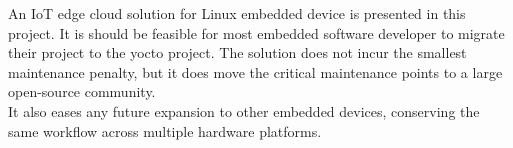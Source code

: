 \documentclass[../../main.tex]{subfiles}
\begin{document}
An IoT edge cloud solution for Linux embedded device is presented in this project.
It is should be feasible for most embedded software developer to migrate their
project to the yocto project.
The solution does not incur the smallest maintenance penalty, but it does move the critical 
maintenance points to a large open-source community.\\

It also eases any future expansion to other embedded devices, conserving the same workflow across
multiple hardware platforms.

	
\end{document}
